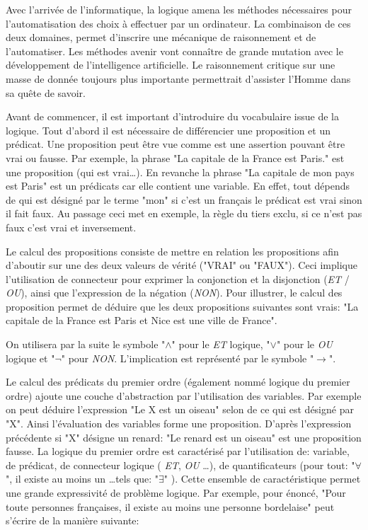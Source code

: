 \begin{refsegment}
    Avec l'arrivée de l'informatique, la logique amena les méthodes nécessaires pour l'automatisation des choix à effectuer par un ordinateur. La combinaison de ces deux domaines, permet d'inscrire une mécanique de raisonnement et de l'automatiser. Les méthodes avenir vont connaître de grande mutation avec le développement de l'intelligence artificielle. Le raisonnement critique sur une masse de donnée toujours plus importante permettrait d'assister l'Homme dans sa quête de savoir.
    
    
    Avant de commencer, il est important d'introduire du vocabulaire issue de la logique. Tout d'abord il est nécessaire de différencier une proposition et un prédicat.  Une proposition peut être vue comme est une assertion pouvant être vrai ou fausse. Par exemple, la phrase "La capitale de la France est Paris." est une proposition (qui est vrai\ldots). En revanche la phrase "La capitale de mon pays est Paris" est un prédicats car elle contient une variable. En effet, tout dépends de qui est désigné par le terme "mon" si c'est un français le prédicat est vrai sinon il fait faux. Au passage ceci met en exemple, la règle du tiers exclu, si ce n'est pas faux c'est vrai et inversement.
    
    Le calcul des propositions consiste de mettre en relation les propositions afin d'aboutir sur une des deux valeurs de vérité ("VRAI" ou "FAUX"). Ceci implique l'utilisation de connecteur pour exprimer la conjonction et la disjonction (\textit{ET} / \textit{OU}), ainsi que l'expression de la négation (\textit{NON}). Pour illustrer, le calcul des proposition permet de déduire que les deux propositions suivantes sont vrais: "La capitale de la France est Paris et Nice est une ville de France".
    
    On utilisera par la suite le symbole "$\land$" pour le \textit{ET} logique, "$\lor$" pour le \textit{OU} logique et "$\lnot$" pour \textit{NON}. L'implication est représenté par le symbole "$\rightarrow$". 
    
    Le calcul des prédicats du premier ordre (également nommé logique du premier ordre) ajoute une couche d'abstraction par l'utilisation des variables. Par exemple on peut déduire l'expression "Le X est un oiseau" selon de ce qui est désigné par "X". Ainsi l'évaluation des variables forme une proposition. D'après l'expression précédente si "X" désigne un renard: "Le renard est un oiseau" est une proposition fausse. La logique du premier ordre est caractérisé par l'utilisation de: variable, de prédicat, de connecteur logique ( \textit{ET}, \textit{OU} \ldots), de quantificateurs (pour tout: "$\forall$", il existe au moins un \ldots tels que: "$\exists$" ). Cette ensemble de caractéristique permet une grande expressivité de problème logique. Par exemple, pour énoncé, "Pour toute personnes françaises, il existe au moins une personne bordelaise" peut s'écrire de la manière suivante:
    

\end{refsegment}

